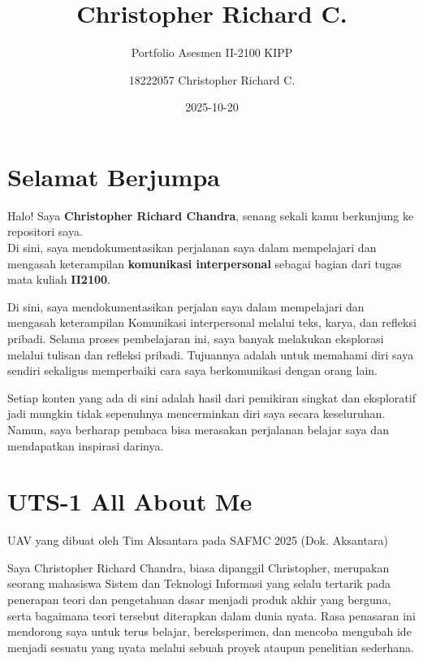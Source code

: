 \documentclass[
  letterpaper,
  DIV=11,
  numbers=noendperiod]{scrreprt}
\title{Christopher Richard C.}
\subtitle{Portfolio Asesmen II-2100 KIPP}
\author{18222057 Christopher Richard C.}
\date{2025-10-20}
\renewcommand*\contentsname{Table of contents}
\newcommand\contentsname{Table of contents}
\begin{document}
\maketitle

\renewcommand*\contentsname{Table of contents}
{
\hypersetup{linkcolor=}
\setcounter{tocdepth}{2}
\tableofcontents
}


\chapter*{Selamat Berjumpa}\label{selamat-berjumpa}


Halo! Saya \textbf{Christopher Richard Chandra}, senang sekali kamu
berkunjung ke repositori saya.\\
Di sini, saya mendokumentasikan perjalanan saya dalam mempelajari dan
mengasah keterampilan \textbf{komunikasi interpersonal} sebagai bagian
dari tugas mata kuliah \textbf{II2100}.

Di sini, saya mendokumentasikan perjalan saya dalam mempelajari dan
mengasah keterampilan Komunikasi interpersonal melalui teks, karya, dan
refleksi pribadi. Selama proses pembelajaran ini, saya banyak melakukan
eksplorasi melalui tulisan dan refleksi pribadi. Tujuannya adalah untuk
memahami diri saya sendiri sekaligus memperbaiki cara saya berkomunikasi
dengan orang lain.

Setiap konten yang ada di sini adalah hasil dari pemikiran singkat dan
eksploratif jadi mungkin tidak sepenuhnya mencerminkan diri saya secara
keseluruhan. Namun, saya berharap pembaca bisa merasakan perjalanan
belajar saya dan mendapatkan inspirasi darinya.


\chapter{UTS-1 All About Me}\label{uts-1-all-about-me}

UAV yang dibuat oleh Tim Aksantara pada SAFMC 2025 (Dok. Aksantara)

Saya Christopher Richard Chandra, biasa dipanggil Christopher, merupakan
seorang mahasiswa Sistem dan Teknologi Informasi yang selalu tertarik
pada penerapan teori dan pengetahuan dasar menjadi produk akhir yang
berguna, serta bagaimana teori tersebut diterapkan dalam dunia nyata.
Rasa penasaran ini mendorong saya untuk terus belajar, bereksperimen,
dan mencoba mengubah ide menjadi sesuatu yang nyata melalui sebuah
proyek ataupun penelitian sederhana.
\end{document}
